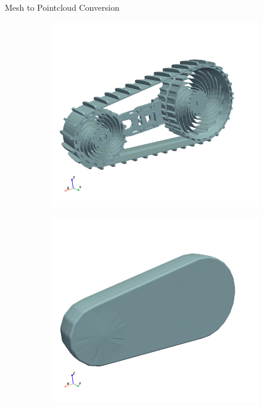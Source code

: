 \documentclass[12pt]{beamer}
\begin{document}
\begin{frame}{Mesh to Pointcloud Conversion}
  \begin{figure}[H]
    \centering
    \begin{subfigure}[t]{0.25\textwidth}
        \centering
        \includegraphics[width=\textwidth]{fig/full_flipper_mesh.png} %
        \label{fig:fig1}
    \end{subfigure}
    \hspace{1cm}
    \begin{subfigure}[t]{0.25\textwidth}
        \centering
        \includegraphics[width=\textwidth]{fig/flipper_delaunay.png} %
        \label{fig:fig2}
    \end{subfigure}
  

\end{figure}
\end{frame}
\end{document}
